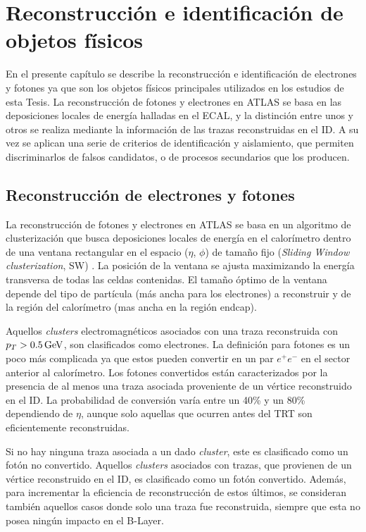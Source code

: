 \chapter{Reconstrucción e identificación de objetos físicos}

En el presente capítulo se describe la reconstrucción e identificación de electrones y fotones ya que son los objetos físicos principales utilizados en los estudios de esta Tesis. La reconstrucción de fotones y electrones en ATLAS se basa en las deposiciones locales de energía halladas en el ECAL, y la distinción entre unos y otros se   realiza mediante la información de las trazas reconstruidas en el ID. A su vez se aplican una serie de criterios de identificación y aislamiento, que permiten discriminarlos de falsos candidatos, o de procesos secundarios que los producen.

\section{Reconstrucción de electrones y fotones}

La  reconstrucción de fotones y electrones en ATLAS se basa en un algoritmo de clusterización \cite{Lampl:1099735} que busca deposiciones locales de energía en el calorímetro dentro de una ventana rectangular en el espacio ($\eta$, $\phi$) de tamaño fijo (\textit{Sliding Window clusterization}, SW) \cite{Monticelli:2227992}. La posición de la ventana se ajusta maximizando la energía transversa de todas las celdas contenidas. El tamaño óptimo de la ventana depende del tipo de partícula (más ancha para los electrones) a reconstruir y de la región del calorímetro (mas ancha en la región endcap). 

Aquellos \textit{clusters} electromagnéticos asociados con una traza reconstruida con $p_{T} > 0.5 \, \mathrm{GeV}$, son clasificados como electrones. La definición para fotones es un poco más complicada ya que estos pueden convertir en un par $e^{+}e^{-}$ en el sector anterior al calorímetro. Los fotones convertidos están caracterizados por la presencia de al menos una traza asociada proveniente de un vértice reconstruido en el ID. La probabilidad de conversión varía entre un 40\% y un 80\% dependiendo de $\eta$, aunque solo aquellas que ocurren antes del TRT son eficientemente reconstruidas. 

Si no hay ninguna traza asociada a un dado \textit{cluster}, este es clasificado como un fotón no convertido. Aquellos \textit{clusters} asociados con trazas, que provienen de un vértice reconstruido en el ID, es clasificado como un fotón convertido. Además, para incrementar la eficiencia de reconstrucción de estos últimos, se consideran también aquellos casos donde solo una traza fue reconstruida, siempre que esta no posea ningún impacto en el B-Layer.

